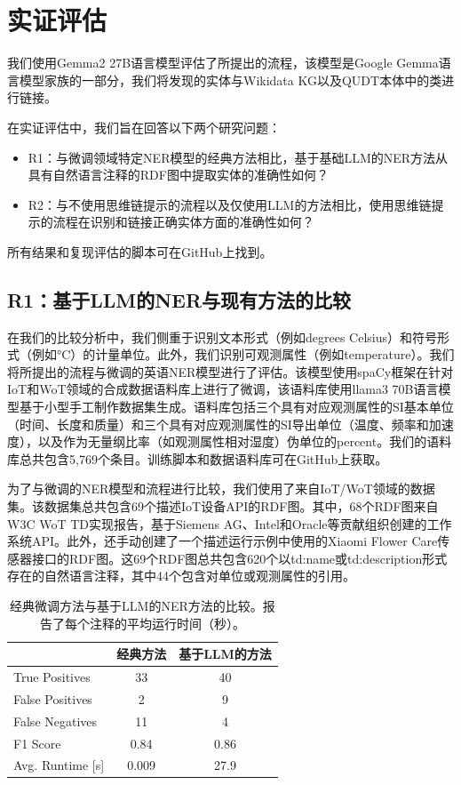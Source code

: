 \documentclass[supercite]{Experimental_Report}
\theoremstyle{definition}
\begin{document}
\section{实证评估}

我们使用Gemma2 27B语言模型评估了所提出的流程，该模型是Google Gemma语言模型家族的一部分\cite{ref9}，我们将发现的实体与Wikidata KG以及QUDT本体中的类进行链接。

在实证评估中，我们旨在回答以下两个研究问题：
\begin{itemize}
    \item R1：与微调领域特定NER模型的经典方法相比，基于基础LLM的NER方法从具有自然语言注释的RDF图中提取实体的准确性如何？
    \item R2：与不使用思维链提示的流程以及仅使用LLM的方法相比，使用思维链提示的流程在识别和链接正确实体方面的准确性如何？
\end{itemize}

所有结果和复现评估的脚本可在GitHub\cite{ref7}上找到。

\subsection{R1：基于LLM的NER与现有方法的比较}

在我们的比较分析中，我们侧重于识别文本形式（例如degrees Celsius）和符号形式（例如°C）的计量单位。此外，我们识别可观测属性（例如temperature）。我们将所提出的流程与微调的英语NER模型\cite{ref8}进行了评估。该模型使用spaCy\cite{ref9}框架在针对IoT和WoT领域的合成数据语料库上进行了微调，该语料库使用llama3 70B语言模型基于小型手工制作数据集生成\cite{ref25}。语料库包括三个具有对应观测属性的SI基本单位（时间、长度和质量）和三个具有对应观测属性的SI导出单位（温度、频率和加速度），以及作为无量纲比率（如观测属性相对湿度）伪单位的percent。我们的语料库总共包含5,769个条目。训练脚本和数据语料库可在GitHub\cite{ref10}上获取。

为了与微调的NER模型和流程进行比较，我们使用了来自IoT/WoT领域的数据集。该数据集总共包含69个描述IoT设备API的RDF图。其中，68个RDF图来自W3C WoT TD实现报告\cite{ref11}，基于Siemens AG、Intel和Oracle等贡献组织创建的工作系统API。此外，还手动创建了一个描述运行示例中使用的Xiaomi Flower Care传感器接口的RDF图。这69个RDF图总共包含620个以td:name或td:description形式存在的自然语言注释，其中44个包含对单位或观测属性的引用。

\begin{table}[htbp]
\centering
\caption{经典微调方法与基于LLM的NER方法的比较。报告了每个注释的平均运行时间（秒）。}
\label{tbl:table1}
\begin{tabular}{lcc}
\toprule
& 经典方法 & 基于LLM的方法 \\
\midrule
True Positives & 33 & 40 \\
False Positives & 2 & 9 \\
False Negatives & 11 & 4 \\
F1 Score & 0.84 & 0.86 \\
Avg. Runtime [s] & 0.009 & 27.9 \\
\bottomrule
\end{tabular}
\end{table}
\end{document}
